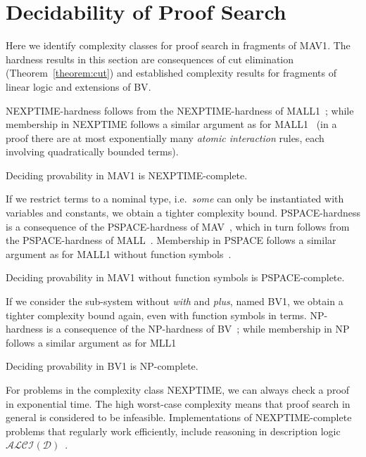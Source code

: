 \documentclass[UKenglish,acmsmall,authorversion]{acmart}
\theoremstyle{plain}
\begin{document}
\section{Decidability of Proof Search}
\label{section:complexity}

Here we identify complexity classes for proof search in fragments of \textsf{MAV1}. %
The hardness results in this section are consequences of cut elimination (Theorem~\ref{theorem:cut}) and established complexity results for fragments of linear logic and extensions of \textsf{BV}.

NEXPTIME-hardness follows from the NEXPTIME-hardness of \textsf{MALL1}~\cite{Lincoln1994}; while membership in NEXPTIME follows a similar argument as for \textsf{MALL1}~\cite{Lincoln1994b} (in a proof there are at most exponentially many \textit{atomic interaction} rules, each involving quadratically bounded terms).
\begin{proposition}\label{proposition:NEXPTIME}
Deciding provability in \textsf{MAV1} is NEXPTIME-complete.
\end{proposition}
%
If we restrict terms to a nominal type, i.e.\ \textit{some} can only be instantiated with variables and constants, we obtain a tighter complexity bound.
PSPACE-hardness is a consequence of the PSPACE-hardness of \textsf{MAV}~\cite{Horne2015}, which in turn follows from the PSPACE-hardness of MALL~\cite{Lincoln1992}. Membership in PSPACE follows a similar argument as for \textsf{MALL1} without function symbols~\cite{Lincoln1994}.
\begin{proposition}\label{proposition:PSPACE}
Deciding provability in \textsf{MAV1} without function symbols is PSPACE-complete.
\end{proposition}
%
If we consider the sub-system without \textit{with} and \textit{plus}, named \textsf{BV1}, we obtain a tighter complexity bound again, even with function symbols in terms.
NP-hardness is a consequence of the NP-hardness of \textsf{BV}~\cite{Ozan2008a}; while membership in NP follows a similar argument as for \textsf{MLL1}~\cite{Lincoln1994b}
\begin{proposition}\label{proposition:NP}
Deciding provability in \textsf{BV1} is NP-complete.
\end{proposition}
For problems in the complexity class NEXPTIME, we can always check a proof in exponential time.
The high worst-case complexity means that proof search in general is considered to be infeasible.
Implementations of NEXPTIME-complete problems that regularly work efficiently, include reasoning in description logic $\mathcal{ALCI(D)}$~\cite{Lutz2004}.
\end{document}
